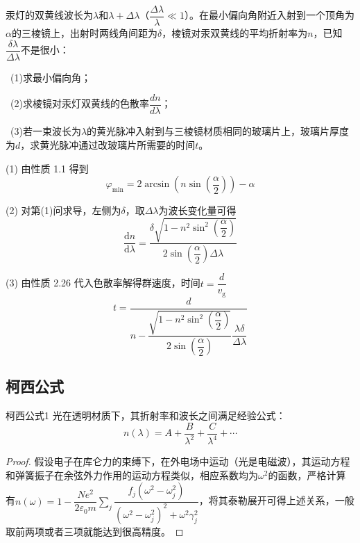 \begin{example}
	汞灯的双黄线波长为$\lambda$和$\lambda+\Delta \lambda$（$\dfrac{\Delta\lambda}{\lambda}\ll 1$）。在最小偏向角附近入射到一个顶角为$\alpha$的三棱镜上，出射时两线角间距为$\delta$，棱镜对汞双黄线的平均折射率为$n$，已知$\dfrac{\delta \lambda}{\Delta \lambda}$不是很小：
	\par \ (1)求最小偏向角；
	\par \ (2)求棱镜对汞灯双黄线的色散率$\dfrac{dn}{d\lambda}$；
	\par \ (3)若一束波长为$\lambda$的黄光脉冲入射到与三棱镜材质相同的玻璃片上，玻璃片厚度为$d$，求黄光脉冲通过改玻璃片所需要的时间$t$。
	\soln

	\par (1) 由性质 1.1 得到
	\[
		\varphi_{\min}=2\arcsin \left(n\sin \left(\dfrac{\alpha}{2}\right)\right)-\alpha	
	\]
	\par (2) 对第(1)问求导，左侧为$\delta$，取$\Delta \lambda$为波长变化量可得
	\[
		\dfrac{\mathrm{d}n}{\mathrm{d}\lambda}=\dfrac{\delta \sqrt{1-n^2\sin ^2\left(\dfrac{\alpha}{2}\right)}}{2\sin \left(\dfrac{\alpha }{2}\right)\Delta \lambda}
	\]	
	\par (3) 由性质 2.26 代入色散率解得群速度，时间$t=\dfrac{d}{v_{\text{g}}}$
	\[
		t=\dfrac{d}{n-\dfrac{\sqrt{1-n^2\sin ^2\left(\dfrac{\alpha}{2}\right)}}{2\sin \left(\dfrac{\alpha }{2}\right)}\dfrac{\lambda \delta}{\Delta \lambda}}	
	\]
\end{example}
\subsection{柯西公式}
\begin{myprop}{柯西公式}{1}
	光在透明材质下，其折射率和波长之间满足经验公式：
	\[
		n(\lambda)=A+\frac{B}{\lambda^2}+\frac{C}{\lambda^4}+\cdots	
	\]
\end{myprop}
\begin{proof}
	假设电子在库仑力的束缚下，在外电场中运动（光是电磁波），其运动方程和弹簧振子在余弦外力作用的运动方程类似，相应系数均为$\omega^2$的函数，严格计算有$n(\omega)=1-\dfrac{N e^2}{2 \varepsilon_0 m} \displaystyle \sum_j \dfrac{f_j\left(\omega^2-\omega_j^2\right)}{\left(\omega^2-\omega_j^2\right)^2+\omega^2 \gamma_j^2}$，将其泰勒展开可得上述关系，一般取前两项或者三项就能达到很高精度。
\end{proof}

